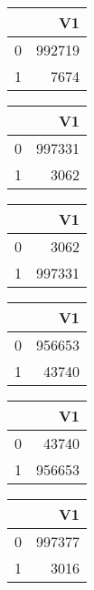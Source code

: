 \bigskip\bigskip
\centering
\begin{tabular}{rr}
  \hline
 & V1 \\ 
  \hline
0 & 992719 \\ 
  1 & 7674 \\ 
   \hline
\end{tabular}

\bigskip\bigskip
\centering
\begin{tabular}{rr}
  \hline
 & V1 \\ 
  \hline
0 & 997331 \\ 
  1 & 3062 \\ 
   \hline
\end{tabular}

\bigskip\bigskip
\centering
\begin{tabular}{rr}
  \hline
 & V1 \\ 
  \hline
0 & 3062 \\ 
  1 & 997331 \\ 
   \hline
\end{tabular}

\bigskip\bigskip
\centering
\begin{tabular}{rr}
  \hline
 & V1 \\ 
  \hline
0 & 956653 \\ 
  1 & 43740 \\ 
   \hline
\end{tabular}

\bigskip\bigskip
\centering
\begin{tabular}{rr}
  \hline
 & V1 \\ 
  \hline
0 & 43740 \\ 
  1 & 956653 \\ 
   \hline
\end{tabular}

\bigskip\bigskip
\centering
\begin{tabular}{rr}
  \hline
 & V1 \\ 
  \hline
0 & 997377 \\ 
  1 & 3016 \\ 
   \hline
\end{tabular}

